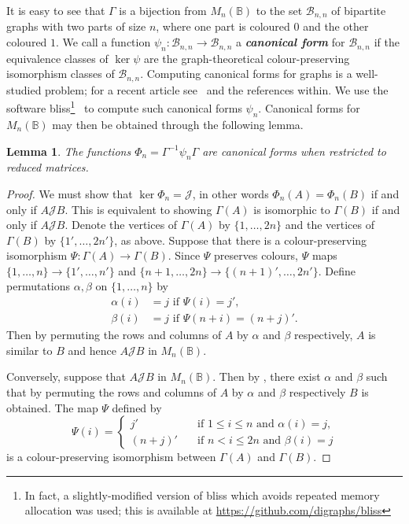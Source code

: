 \documentclass[11pt]{article}
\newtheorem{lemma}[thm]{Lemma}
\newcommand{\defn}[1]{\textbf{\textit{#1}}}
\numberwithin{equation}{section}
\renewcommand{\to}{\longrightarrow}
\newcommand{\B}{\mathbb{B}}
\newcommand{\Bn}{M_n(\B)}
\newcommand{\J}{\mathscr{J}}
\newcommand{\BGSet}{\mathcal{B}_{n,n}}
\begin{document}
It is easy to see that $\Gamma$ is a bijection from $\Bn$ to the set $\BGSet$ of
bipartite graphs with two parts of size $n$, where one part is coloured $0$ and
the other coloured $1$. We call a function $\psi_n: \BGSet \to \BGSet$ a
\defn{canonical form} for $\BGSet$ if the equivalence classes of $\ker\psi$ are
the graph-theoretical colour-preserving isomorphism classes of $\BGSet$.
Computing canonical forms for graphs is a well-studied problem; for a recent
article see~\cite{McKay2013aa} and the references within. 
We use the software bliss\footnote{In fact, a slightly-modified version of bliss
  which avoids repeated memory allocation was used; this is available at
  \url{https://github.com/digraphs/bliss}}~\cite{Junttila2007aa, Bliss} to
compute such canonical forms $\psi_n$. Canonical forms for $\Bn$ may then be
obtained through the following lemma.
\begin{lemma}
  The functions $\Phi_n = \Gamma^{-1}\psi_n\Gamma$ are canonical forms when
  restricted to reduced matrices. 
\end{lemma}
\begin{proof}
  We must show that $\ker\Phi_n = \J$, in other words $\Phi_n(A) = \Phi_n(B)$ if and
  only if $A\J B$. This is equivalent to showing $\Gamma(A)$ is isomorphic to
  $\Gamma(B)$ if and only if $A \J B$. Denote the vertices of $\Gamma(A)$ by
  $\{1, \ldots, 2 n\}$ and the vertices of $\Gamma(B)$ by $\{1', \ldots, 2n'\}$,
  as above.
  Suppose that there is a colour-preserving isomorphism $\Psi: \Gamma(A) \to
  \Gamma(B)$. Since $\Psi$ preserves colours, $\Psi$ maps $\{1, \ldots, n\} \to
  \{1', \ldots, n'\}$ and $\{n + 1, \ldots, 2n\} \to \{(n + 1)', \ldots, 2n'\}$.
  Define permutations $\alpha, \beta$ on $\{1,\ldots, n\}$ by 
  \begin{align*}
    \alpha(i) &= j \text{ if } \Psi(i) = j',\\
    \beta(i)  &= j \text{ if } \Psi(n + i) = (n + j)'.
  \end{align*}
  Then by permuting the rows and columns of $A$ by $\alpha$ and $\beta$
  respectively, $A$ is similar to $B$ and hence $A \J B$ in $\Bn$.

  Conversely, suppose that $A \J B$ in $\Bn$. Then by
  , there exist $\alpha$ and $\beta$ such
  that by permuting the rows and columns of $A$ by $\alpha$ and $\beta$
  respectively $B$ is obtained. The map $\Psi$ defined by
  \[\Psi(i) = \begin{cases}
      j' \quad &\text{if } 1 \leq i \leq n \text{ and }\alpha(i) = j, \\
      (n + j)' \quad &\text{if } n < i \leq 2n \text{ and }\beta(i) = j
    \end{cases}
  \]
  is a colour-preserving isomorphism between $\Gamma(A)$ and $\Gamma(B)$.
\end{proof}
\end{document}

